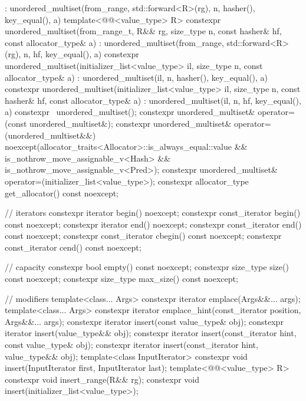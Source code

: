 \begin{codeblock}
{{        : unordered_multiset(from_range, std::forward<R>(rg),
                             n, hasher(), key_equal(), a) { }
    template<@@<value_type> R>
      constexpr unordered_multiset(from_range_t, R&& rg, size_type n, const hasher& hf,
                                   const allocator_type& a)
        : unordered_multiset(from_range, std::forward<R>(rg), n, hf, key_equal(), a) { }
    constexpr unordered_multiset(initializer_list<value_type> il, size_type n,
                                 const allocator_type& a)
      : unordered_multiset(il, n, hasher(), key_equal(), a) { }
    constexpr unordered_multiset(initializer_list<value_type> il, size_type n, const hasher& hf,
                       const allocator_type& a)
      : unordered_multiset(il, n, hf, key_equal(), a) { }
    constexpr ~unordered_multiset();
    constexpr unordered_multiset& operator=(const unordered_multiset&);
    constexpr unordered_multiset& operator=(unordered_multiset&&)
      noexcept(allocator_traits<Allocator>::is_always_equal::value &&
               is_nothrow_move_assignable_v<Hash> && is_nothrow_move_assignable_v<Pred>);
    constexpr unordered_multiset& operator=(initializer_list<value_type>);
    constexpr allocator_type get_allocator() const noexcept;

    // iterators
    constexpr iterator       begin() noexcept;
    constexpr const_iterator begin() const noexcept;
    constexpr iterator       end() noexcept;
    constexpr const_iterator end() const noexcept;
    constexpr const_iterator cbegin() const noexcept;
    constexpr const_iterator cend() const noexcept;

    // capacity
    constexpr bool empty() const noexcept;
    constexpr size_type size() const noexcept;
    constexpr size_type max_size() const noexcept;

    // modifiers
    template<class... Args> constexpr iterator emplace(Args&&... args);
    template<class... Args>
      constexpr iterator emplace_hint(const_iterator position, Args&&... args);
    constexpr iterator insert(const value_type& obj);
    constexpr iterator insert(value_type&& obj);
    constexpr iterator insert(const_iterator hint, const value_type& obj);
    constexpr iterator insert(const_iterator hint, value_type&& obj);
    template<class InputIterator> constexpr void insert(InputIterator first, InputIterator last);
    template<@@<value_type> R>
      constexpr void insert_range(R&& rg);
    constexpr void insert(initializer_list<value_type>);

}}
\end{codeblock}
